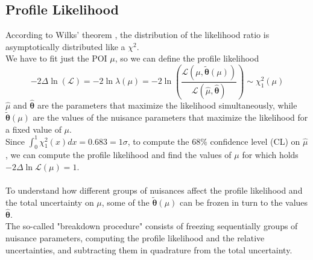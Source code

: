 \subsection{Profile Likelihood}\label{sec:profile}
According to Wilks' theorem \cite{James2006StatisticalEdition}, the distribution of the likelihood ratio is asymptotically distributed like a $\chi^2$.
\\
We have to fit just the POI $\mu$, so we can define the profile likelihood
\begin{equation}
    -2 \Delta \ln(\mathcal{L})=-2 \ln{\lambda(\mu)}= -2 \ln \left( \frac{\mathcal{L}(\mu,\bm{\tilde{\theta}}(\mu))}{\mathcal{L}(\hat{\mu}, \bm{\hat{\theta}})}\right) \sim \chi^2_1(\mu)
\end{equation}
$\hat{\mu}$ and $\bm{\hat{\theta}}$ are the parameters that maximize the likelihood simultaneously, while $\bm{\tilde{\theta}}(\mu)$ are the values of the nuisance parameters that maximize the likelihood for a fixed value of $\mu$.\\
Since $\int_0^1\chi^2_1(x) dx =0.683 = 1\sigma$, to compute the 68\% confidence level (CL) on $\hat{\mu}$, we can compute the profile likelihood and find the values of $\mu$ for which holds $-2\Delta \ln{\mathcal{L}(\mu)}=1$.\\
\\
To understand how different groups of nuisances affect the profile likelihood and the total uncertainty on $\mu$, some of the $\bm{\tilde{\theta}}(\mu)$ can be frozen in turn to the values $\bm{\hat{\theta}}$.\\
The so-called "breakdown procedure" consists of freezing sequentially groups of nuisance parameters, computing the profile likelihood and the relative uncertainties, and subtracting them in quadrature from the total uncertainty.



